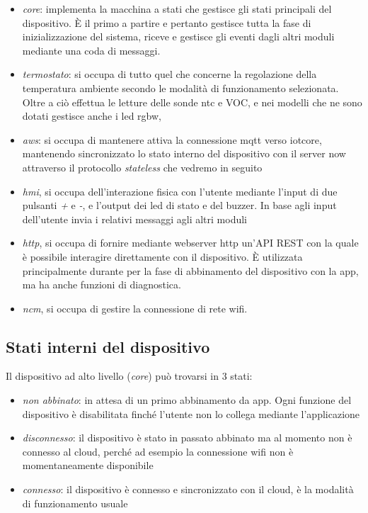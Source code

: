 \documentclass[12pt,a4paper,twoside,titlepage]{book}
\begin{document}
\begin{itemize}
    \item \textit{core}: implementa la macchina a stati che gestisce gli stati principali del dispositivo. 
        È il primo a partire e pertanto gestisce tutta la fase di inizializzazione del sistema, riceve e gestisce 
        gli eventi dagli altri moduli mediante una coda di messaggi.  
    \item \textit{termostato}: si occupa di tutto quel che concerne la regolazione della temperatura ambiente 
        secondo le modalità di funzionamento selezionata. Oltre a ciò effettua le letture delle sonde \acrshort{ntc}
        e VOC, e nei modelli che ne sono dotati gestisce anche i \acrshort{led} \acrshort{rgbw}, 
    \item \textit{\acrshort{aws}}: si occupa di mantenere attiva la connessione \Gls{mqtt} verso \Gls{iotcore},
        mantenendo sincronizzato lo stato interno del dispositivo con il server \Gls{now} attraverso il protocollo 
        \textit{stateless} che vedremo in seguito
    \item \textit{\acrshort{hmi}}, si occupa dell'interazione fisica con l'utente mediante l'input di due pulsanti \textit{+} e 
        \textit{-}, e l'output dei \acrshort{led} di stato e del buzzer. In base agli input dell'utente invia i relativi 
        messaggi agli altri moduli
    \item \textit{\acrshort{http}}, si occupa di fornire mediante webserver \acrshort{http} un'API REST con
        la quale è possibile interagire direttamente con il dispositivo. È utilizzata principalmente durante per 
        la fase di abbinamento del dispositivo con la app, ma ha anche funzioni di diagnostica.
    \item \textit{\acrfull{ncm}}, si occupa di gestire la connessione di rete \Gls{wifi}. 
\end{itemize}

\subsection{Stati interni del dispositivo}

Il dispositivo ad alto livello (\textit{core}) può trovarsi in 3 stati:

\begin{itemize}
    \item \textit{non abbinato}: in attesa di un primo abbinamento da app. Ogni funzione del
        dispositivo è disabilitata finché l'utente non lo collega mediante l'applicazione
    \item \textit{disconnesso}: il dispositivo è stato in passato abbinato ma al momento non è
        connesso al cloud, perché ad esempio la connessione \Gls{wifi} non è momentaneamente disponibile
    \item \textit{connesso}: il dispositivo è connesso e sincronizzato con il cloud, è la modalità di funzionamento usuale
\end{itemize}
\end{document}
